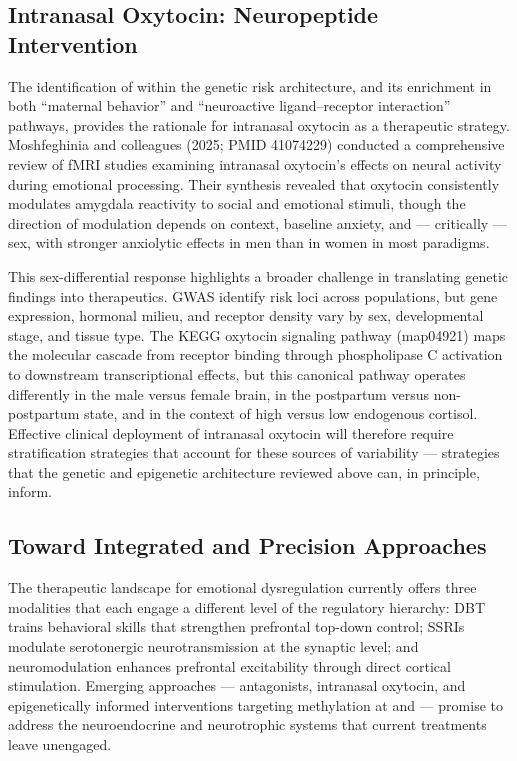 \subsection*{Intranasal Oxytocin: Neuropeptide Intervention}

The identification of  within the genetic risk architecture, and its
enrichment in both ``maternal behavior'' and ``neuroactive ligand--receptor
interaction'' pathways, provides the rationale for intranasal oxytocin as a
therapeutic strategy.\cite{szklarczyk2023}
Moshfeghinia and colleagues (2025; PMID 41074229) conducted a comprehensive
review of fMRI studies examining intranasal oxytocin's effects on neural
activity during emotional processing.\cite{moshfeghinia2025}
Their synthesis revealed that oxytocin consistently modulates amygdala
reactivity to social and emotional stimuli, though the direction of modulation
depends on context, baseline anxiety, and — critically — sex, with stronger
anxiolytic effects in men than in women in most paradigms.

This sex-differential response highlights a broader challenge in translating
genetic findings into therapeutics.
GWAS identify risk loci across populations, but gene expression, hormonal
milieu, and receptor density vary by sex, developmental stage, and tissue
type.
The KEGG oxytocin signaling pathway (map04921) maps the molecular cascade from
receptor binding through phospholipase C activation to downstream
transcriptional effects, but this canonical pathway operates differently in
the male versus female brain, in the postpartum versus non-postpartum state,
and in the context of high versus low endogenous cortisol.\cite{moshfeghinia2025}
Effective clinical deployment of intranasal oxytocin will therefore require
stratification strategies that account for these sources of variability —
strategies that the genetic and epigenetic architecture reviewed above can, in
principle, inform.

\subsection*{Toward Integrated and Precision Approaches}

The therapeutic landscape for emotional dysregulation currently offers three
modalities that each engage a different level of the regulatory hierarchy:
DBT trains behavioral skills that strengthen prefrontal top-down control;
SSRIs modulate serotonergic neurotransmission at the synaptic level; and
neuromodulation enhances prefrontal excitability through direct cortical
stimulation.
Emerging approaches —  antagonists, intranasal oxytocin, and
epigenetically informed interventions targeting methylation at  and
 — promise to address the neuroendocrine and neurotrophic systems
that current treatments leave unengaged.\cite{udalov2026}

